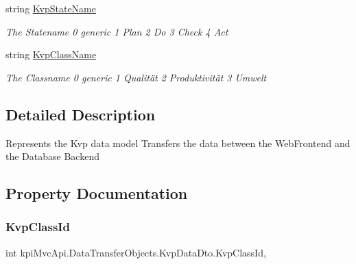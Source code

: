 \begin{DoxyCompactItemize}
string \hyperlink{classkpi_mvc_api_1_1_data_transfer_objects_1_1_kvp_data_dto_a4d61657eaf038f17856597d2ea5aeeec}{Kvp\+State\+Name}
\begin{DoxyCompactList}\small\item\em The Statename 0 generic 1 Plan 2 Do 3 Check 4 Act \end{DoxyCompactList}\item 
string \hyperlink{classkpi_mvc_api_1_1_data_transfer_objects_1_1_kvp_data_dto_a2ae1f8aa2bc5716cb04a540da440f487}{Kvp\+Class\+Name}
\begin{DoxyCompactList}\small\item\em The Classname 0 generic 1 Qualität 2 Produktivität 3 Umwelt \end{DoxyCompactList}\end{DoxyCompactItemize}


\subsection{Detailed Description}
Represents the Kvp data model Transfers the data between the Web\+Frontend and the Database Backend 



\subsection{Property Documentation}
\mbox{\label{classkpi_mvc_api_1_1_data_transfer_objects_1_1_kvp_data_dto_a986c84b6d185a7501cf9c7dc90821fb7}} 
\subsubsection{\texorpdfstring{Kvp\+Class\+Id}{KvpClassId}}
{\footnotesize\ttfamily int kpi\+Mvc\+Api.\+Data\+Transfer\+Objects.\+Kvp\+Data\+Dto.\+Kvp\+Class\+Id\hspace{0.3cm}{\ttfamily [get]}, {\ttfamily [set]}}



